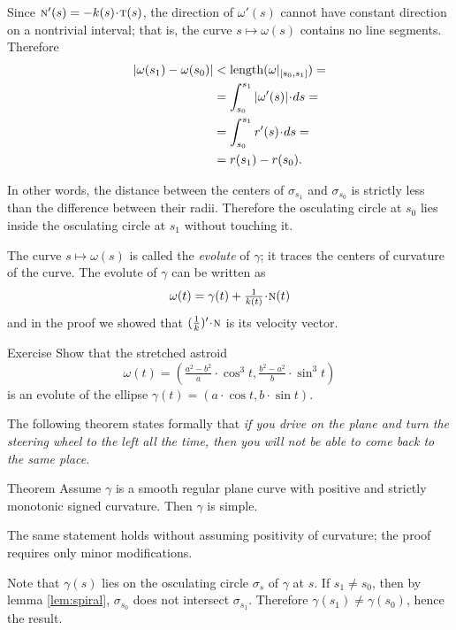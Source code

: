 Since $\norm'(s)=-\skur(s)\cdot\tan(s)$, the direction of $\omega'(s)$ cannot have constant direction on a nontrivial interval;
that is, the curve $s\mapsto \omega(s)$ contains no line segments.
Therefore 
\begin{align*}
|\omega(s_1)-\omega(s_0)|&<\length(\omega|_{[s_0,s_1]})=
\\
&=\int_{s_0}^{s_1}|\omega'(s)|\cdot ds=
\\
&=\int_{s_0}^{s_1}r'(s)\cdot ds=
\\
&=r(s_1)-r(s_0).
\end{align*}

In other words, the distance between the centers of $\sigma_{s_1}$ and $\sigma_{s_0}$
is strictly less than the difference between their radii.
Therefore the osculating circle at $s_0$ lies inside the osculating circle at $s_1$ without touching it.
\qeds

The curve $s\mapsto \omega(s)$ is called the \emph{evolute} of $\gamma$; 
it traces the centers of curvature of the curve. 
The evolute of $\gamma$ can be written as 
\[\omega(t)=\gamma(t)+\tfrac1{\skur(t)}\cdot \norm(t)\] and  
in the proof we showed that $(\tfrac1{\skur})'\cdot\norm$ is its velocity vector.

\begin{thm}{Exercise}\label{ex:evolute-of-ellipse}
Show that the stretched astroid 
\[\omega(t)=(\tfrac{a^2-b^2}{a}\cdot \cos^3 t,  \tfrac{b^2-a^2}{b}\cdot\sin^3 t)\]
is an evolute of the ellipse $\gamma(t)= (a\cdot \cos t, b\cdot\sin t)$.
\end{thm}


The following theorem states formally that 
\emph{if you drive on the plane and turn the steering wheel to the left all the time,
then you will not be able to come back to the same place.}

\begin{thm}{Theorem}\label{thm:spiral}
Assume $\gamma$ is a smooth regular plane curve with positive and strictly monotonic signed curvature. 
Then $\gamma$ is simple.
\end{thm}

The same statement holds without assuming positivity of curvature; the proof requires only minor modifications.

Note that $\gamma(s)$ lies on the osculating circle $\sigma_s$ of $\gamma$ at $s$.
If $s_1\ne s_0$, then by lemma \ref{lem:spiral}, $\sigma_{s_0}$ does not intersect $\sigma_{s_1}$.
Therefore $\gamma(s_1)\ne \gamma(s_0)$,
hence the result.\qeds

